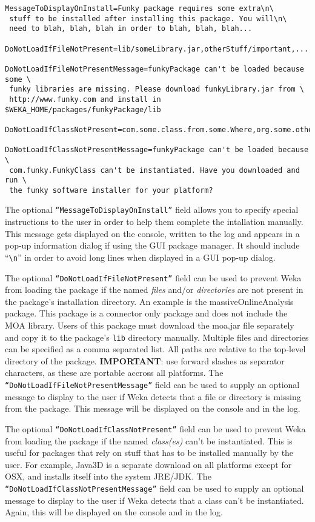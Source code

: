 {\scriptsize
\begin{verbatim}
MessageToDisplayOnInstall=Funky package requires some extra\n\
 stuff to be installed after installing this package. You will\n\
 need to blah, blah, blah in order to blah, blah, blah...

DoNotLoadIfFileNotPresent=lib/someLibrary.jar,otherStuff/important,...

DoNotLoadIfFileNotPresentMessage=funkyPackage can't be loaded because some \
 funky libraries are missing. Please download funkyLibrary.jar from \
 http://www.funky.com and install in $WEKA_HOME/packages/funkyPackage/lib

DoNotLoadIfClassNotPresent=com.some.class.from.some.Where,org.some.other.Class,...

DoNotLoadIfClassNotPresentMessage=funkyPackage can't be loaded because \
 com.funky.FunkyClass can't be instantiated. Have you downloaded and run \
 the funky software installer for your platform?
\end{verbatim}}

The optional \texttt{``MessageToDisplayOnInstall''} field allows you
to specify special instructions to the user in order to help them
complete the intallation manually.  This message gets displayed on the
console, written to the log and appears in a pop-up information dialog
if using the GUI package manager. It should include ``\verb=\n='' in
order to avoid long lines when displayed in a GUI pop-up dialog.

The optional \texttt{``DoNotLoadIfFileNotPresent''} field can be used
to prevent Weka from loading the package if the named \textit{files}
and/or \textit{directories} are not present in the package's
installation directory. An example is the massiveOnlineAnalysis
package. This package is a connector only package and does not include
the MOA library. Users of this package must download the moa.jar file
separately and copy it to the package's \texttt{lib} directory
manually. Multiple files and directories can be specified as a comma
separated list. All paths are relative to the top-level directory of
the package. \textbf{IMPORTANT}: use forward slashes as separator
characters, as these are portable accross all platforms. The
\texttt{``DoNotLoadIfFileNotPresentMessage''} field can be used to
supply an optional message to display to the user if Weka detects that
a file or directory is missing from the package. This message will be
displayed on the console and in the log.

The optional \texttt{``DoNotLoadIfClassNotPresent''} field can be used
to prevent Weka from loading the package if the named
\textit{class(es)} can't be instantiated. This is useful for packages
that rely on stuff that has to be installed manually by the user. For
example, Java3D is a separate download on all platforms except for
OSX, and installs itself into the system JRE/JDK. The
\texttt{``DoNotLoadIfClassNotPresentMessage''} field can be used to
supply an optional message to display to the user if Weka detects that
a class can't be instantiated. Again, this will be displayed on the
console and in the log.

